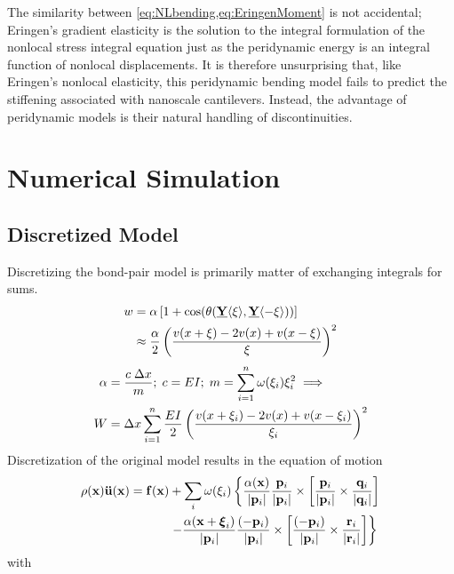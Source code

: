 \documentclass[preprint,review,12pt]{elsarticle}
\newcommand\vstate[3]{%
	\mathbf{\underline{#1}}%
	\ifstrempty{#2}{}{[#2]}%
	\ifstrempty{#3}{}{\langle #3 \rangle}}
\begin{document}
The similarity between \cref{eq:NLbending,eq:EringenMoment} is not accidental; Eringen's gradient elasticity is the solution to the integral formulation of the nonlocal stress integral equation just as the peridynamic energy is an integral function of nonlocal displacements.
It is therefore unsurprising that, like Eringen's nonlocal elasticity\cite{Challamel2008small}, this peridynamic bending model fails to predict the stiffening associated with nanoscale cantilevers.
Instead, the advantage of peridynamic models is their natural handling of discontinuities.

\section{Numerical Simulation}
\label{sec:Numerical}
\subsection{Discretized Model}
\label{sec:Discretized}
Discretizing the bond-pair model is primarily matter of exchanging integrals for sums. 
%
\begin{align}
w &= \alpha \left[1+\cos(\theta(\vstate{Y}{}{\xi},\vstate{Y}{}{\mathbf{-\xi}})) \right] \notag \\
&\approx \frac{\alpha}{2}\left(\frac{v(x+\xi)-2v(x)+v(x-\xi)}{\xi}\right)^2 \notag
\end{align}
%
\begin{align}
\label{eq:discretebeam}
\alpha &= \frac{c\; \Delta x}{m} ;\; c= EI ;\; m=\sum_{i=1}^n \omega(\xi_i)\xi_i^2 \implies \nonumber \\
W&=\Delta x \sum_{i=1}^n \frac{EI}{2}\left(\frac{v(x+\xi_i)-2v(x)+v(x-\xi_i)}{\xi_i}\right)^2\notag
\end{align}
%
Discretization of the original model results in the equation of motion
\begin{align}
\rho(\mathbf{x})\mathbf{\ddot{u}}(\mathbf{x}) = \mathbf{f}(\mathbf{x})&+\sum_i \omega(\xi_i)\left\{\frac{\alpha(\mathbf{x})}{|\mathbf{p}_i |}\frac{\mathbf{p}_i}{|\mathbf{p}_i |}\times \left[ \frac{\mathbf{p}_i}{|\mathbf{p}_i |}\times \frac{\mathbf{q}_i}{|\mathbf{q}_i |}\right] \right. \notag \\
& \left. -\frac{\alpha(\mathbf{x}+\boldsymbol{\xi}_i)}{|\mathbf{p}_i |}\frac{(-\mathbf{p}_i)}{|\mathbf{p}_i |}\times\left[\frac{(-\mathbf{p}_i)}{|\mathbf{p}_i |}\times \frac{\mathbf{r}_i}{|\mathbf{r}_i |} \right] \right\} \notag
\end{align}
with
\end{document}
